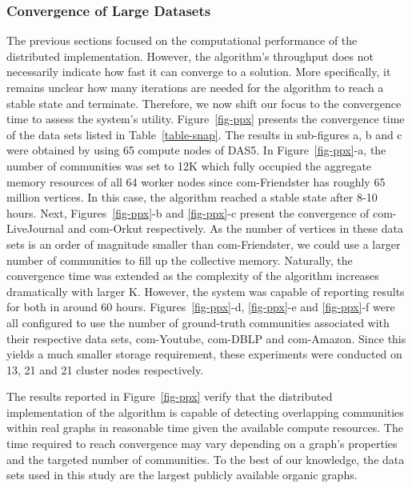\subsubsection{Convergence of Large Datasets}

The previous sections focused on the computational performance of the
distributed implementation. However, the algorithm's throughput does not
necessarily indicate how fast it can converge to a solution. More specifically, it
remains unclear how many iterations are needed for the algorithm to reach a
stable state and terminate. Therefore, we now shift our focus to the
convergence time to assess the system's utility. Figure~\ref{fig-ppx} presents
the convergence time of the data sets listed in Table~\ref{table-snap}.
%
The results in sub-figures a, b and c were obtained by using 65 compute nodes
of DAS5. In Figure~\ref{fig-ppx}-a, the number of communities was set to 12K
which fully occupied the aggregate memory resources of all 64 worker nodes since
com-Friendster has roughly 65 million vertices. In this case, the algorithm
reached a stable state after 8-10 hours. Next, Figures~\ref{fig-ppx}-b and
\ref{fig-ppx}-c present the convergence of com-LiveJournal and com-Orkut
respectively. As the number of vertices in these data sets is an order of
magnitude smaller than com-Friendster, we could use a larger number of
communities to fill up the collective memory. Naturally, the convergence time was extended as the complexity of
the algorithm increases dramatically with larger K. However, the system was
capable of reporting results for both in around 60 hours.
%
Figures~\ref{fig-ppx}-d, \ref{fig-ppx}-e and \ref{fig-ppx}-f were all
configured to use the number of ground-truth communities associated with
their respective data sets, com-Youtube, com-DBLP and com-Amazon. Since this
yields a much smaller storage requirement,
these experiments were conducted on 13, 21 and 21 cluster nodes respectively.

The results reported in Figure~\ref{fig-ppx} verify that the distributed
implementation of the algorithm is capable of detecting overlapping communities
within real graphs in reasonable time given the available compute resources.
The time required to reach convergence may vary depending on a graph's properties and
the targeted number of communities. To the best of our knowledge, the data sets
used in this study are the largest publicly available organic graphs.

